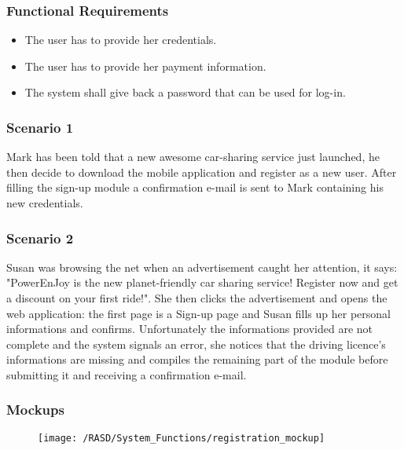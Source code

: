 \subsubsection{Functional Requirements}
\begin{itemize}
  \item The user has to provide her credentials. 
  \item The user has to provide her payment information.
  \item The system shall give back a password that can be used for log-in.
\end{itemize}


\subsubsection{Scenario 1}
Mark has been told that a new awesome car-sharing service just launched, he then decide to download the mobile application and register as a new user. After filling the sign-up module a confirmation e-mail is sent to Mark containing his new credentials.


\subsubsection{Scenario 2}
Susan was browsing the net when an advertisement caught her attention, it says: "PowerEnJoy is the new planet-friendly car sharing service! Register now and get a discount on your first ride!". She then clicks the advertisement and opens the web application: the first page is a Sign-up page and Susan fills up her personal informations and confirms. Unfortunately the informations provided are not complete and the system signals an error, she notices that the driving licence's informations are missing and compiles the remaining part of the module before submitting it and receiving a confirmation e-mail.


\subsubsection{Mockups}
\begin{figure}[!ht]
  \centering
  \vspace{0.2cm}
  \texttt{[image: /RASD/System\_Functions/registration\_mockup]}\\
  \vspace{0.4cm}
  \label{fig:registration_mockup} 
\end{figure}


